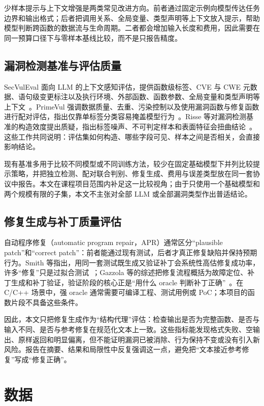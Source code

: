 \documentclass[conference]{IEEEtran}
\begin{document}
少样本提示与上下文增强是两类常见改进方向。前者通过固定示例向模型传达任务边界和输出格式；后者把调用关系、全局变量、类型声明等上下文放入提示，帮助模型判断跨函数的数据流与生命周期。二者都会增加输入长度和费用，因此需要在同一预算口径下与零样本基线比较，而不是只报告精度。

\subsection{漏洞检测基准与评估质量}
SecVulEval 面向 LLM 的上下文感知评估，提供函数级标签、CVE 与 CWE 元数据、语句级变更标注以及执行环境、外部函数、函数参数、全局变量和类型声明等上下文~\cite{ahmed2026secvuleval,secvulevaldata}。PrimeVul 强调数据质量、去重、污染控制以及使用漏洞函数与修复函数进行配对评估，指出仅靠单标签分类容易掩盖模型行为~\cite{ding2025primevul}。Risse 等对漏洞检测基准的构造效度提出质疑，指出标签噪声、不可判定样本和表面特征会扭曲结论~\cite{risse2024limits,risse2025topscore}。这些工作共同说明：评估集如何构造、哪些字段可见、样本之间是否相关，会直接影响结论。

现有基准多用于比较不同模型或不同训练方法，较少在固定基础模型下并列比较提示策略，并把独立检测、配对联合判别、修复生成、费用与误差类型放在同一套协议中报告。本文在课程项目范围内补足这一比较视角；由于只使用一个基础模型和两个规模有限的子集，本文不主张对全部 LLM 或全部漏洞类型作出普适结论。

\subsection{修复生成与补丁质量评估}
自动程序修复（automatic program repair，APR）通常区分“plausible patch”和“correct patch”：前者能通过现有测试，后者才真正修复缺陷并保持预期行为。Smith 等指出，用同一套测试既生成又验证补丁会系统性高估修复成功率，许多“修复”只是过拟合测试~\cite{smith2015overfitting}；Gazzola 等的综述把修复流程概括为故障定位、补丁生成和补丁验证，验证阶段的核心正是“用什么 oracle 判断补丁正确”~\cite{gazzola2019apr}。在 C/C++ 场景中，强 oracle 通常需要可编译工程、测试用例或 PoC；本项目的函数片段不具备这些条件。

因此，本文只把修复生成作为“结构代理”评估：检查输出是否为完整函数、是否与输入不同、是否与参考修复在规范化文本上一致。这些指标能发现格式失败、空输出、原样返回和明显偏离，但不能证明漏洞已被消除、行为保持不变或没有引入新风险。报告在摘要、结果和局限性中反复强调这一点，避免把“文本接近参考修复”写成“修复正确”。

\section{数据}
\label{sec:data}
\end{document}
